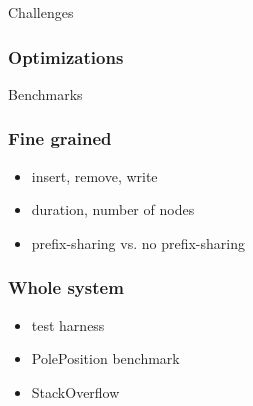 \documentclass{beamer}
\begin{document}
  \begin{section}{Challenges}
    \begin{frame}
      \frametitle{Optimizations}
    \end{frame}
  \end{section}


  \begin{section}{Benchmarks}
    \begin{frame}
      \frametitle{Fine grained}
        \begin{itemize}
          \item insert, remove, write
          \item duration, number of nodes
          \item prefix-sharing vs. no prefix-sharing
        \end{itemize}
    \end{frame}
    \begin{frame}
      \frametitle{Whole system}
        \begin{itemize}
          \item test harness
          \item PolePosition benchmark
          \item StackOverflow
        \end{itemize}
    \end{frame}
  \end{section}
\end{document}

